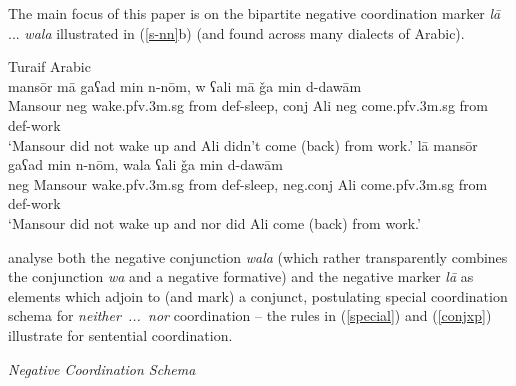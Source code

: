 \documentclass[output=paper,hidelinks]{langscibook}
\begin{document}


The main focus of this paper is on the bipartite negative coordination marker {\em l\={a}} ... {\em wala} illustrated in (\ref{s-nn}b)   (and found across many dialects of Arabic).


\ea  \label{s-nn} Turaif Arabic \citep[32--33]{AlruwailiSadler:2018} \\
\ea
\gll
mans\={o}r m\={a} gaʕad min n-n\={o}m,  w  ʕali m\={a}  \v{g}a min d-daw\={a}m\\
Mansour {\sc neg} wake.{\sc pfv.3m.sg} from {\sc def}-sleep, {\sc conj} Ali {\sc neg} come.{\sc pfv.3m.sg} from {\sc def}-work\\
\glt `Mansour did not wake up and  Ali didn't  come (back) from work.'
\ex
\gll
l\={a} mans\={o}r gaʕad min n-n\={o}m, wala ʕali \v{g}a min d-daw\={a}m\\
 {\sc neg} Mansour wake.{\sc pfv.3m.sg} from {\sc def}-sleep, {\sc neg.conj} Ali come.{\sc pfv.3m.sg} from {\sc def}-work\\
\glt `Mansour did not wake up and nor did Ali come (back) from work.'
 \z
\z



\citet{AlruwailiSadler:2018} analyse both  the negative conjunction {\em wala} (which rather transparently combines the conjunction {\em wa} and a negative formative) and the negative marker  {\em l\={a}} as elements which adjoin to (and mark) a conjunct, postulating special coordination schema for {\em neither~...~nor} coordination -- the rules in (\ref{special}) and (\ref{conjxp}) \citep[38]{AlruwailiSadler:2018}  illustrate for sentential coordination.




\ea
\label{special} {\em Negative Coordination Schema}\\[1ex]
\z
\end{document}
